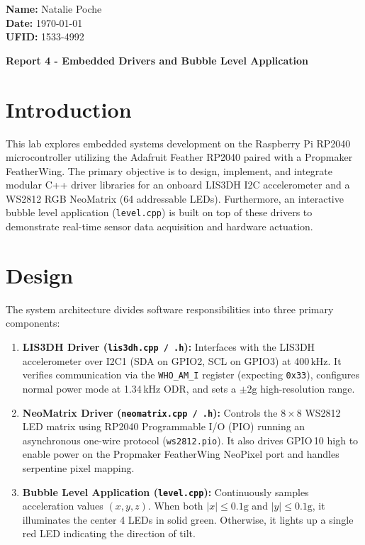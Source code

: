 \documentclass{article}
\begin{document}
\noindent \textbf{Name:} Natalie Poche \\
\textbf{Date:} \today \\
\textbf{UFID:} 1533-4992

\begin{center}
    \large\textbf{Report 4 - Embedded Drivers and Bubble Level Application}
\end{center}

\section{Introduction}
This lab explores embedded systems development on the Raspberry Pi RP2040 microcontroller utilizing the Adafruit Feather RP2040 paired with a Propmaker FeatherWing. The primary objective is to design, implement, and integrate modular C++ driver libraries for an onboard LIS3DH I2C accelerometer and a WS2812 RGB NeoMatrix (64 addressable LEDs). Furthermore, an interactive bubble level application (\texttt{level.cpp}) is built on top of these drivers to demonstrate real-time sensor data acquisition and hardware actuation.

\section{Design}
The system architecture divides software responsibilities into three primary components:
\begin{enumerate}
    \item \textbf{LIS3DH Driver (\texttt{lis3dh.cpp / .h}):} Interfaces with the LIS3DH accelerometer over I2C1 (SDA on GPIO2, SCL on GPIO3) at 400\,kHz. It verifies communication via the \texttt{WHO\_AM\_I} register (expecting \texttt{0x33}), configures normal power mode at 1.34\,kHz ODR, and sets a $\pm 2\text{g}$ high-resolution range.
    \item \textbf{NeoMatrix Driver (\texttt{neomatrix.cpp / .h}):} Controls the $8 \times 8$ WS2812 LED matrix using RP2040 Programmable I/O (PIO) running an asynchronous one-wire protocol (\texttt{ws2812.pio}). It also drives GPIO\,10 high to enable power on the Propmaker FeatherWing NeoPixel port and handles serpentine pixel mapping.
    \item \textbf{Bubble Level Application (\texttt{level.cpp}):} Continuously samples acceleration values $(x, y, z)$. When both $|x| \le 0.1\text{g}$ and $|y| \le 0.1\text{g}$, it illuminates the center 4 LEDs in solid green. Otherwise, it lights up a single red LED indicating the direction of tilt.
\end{enumerate}
\end{document}
